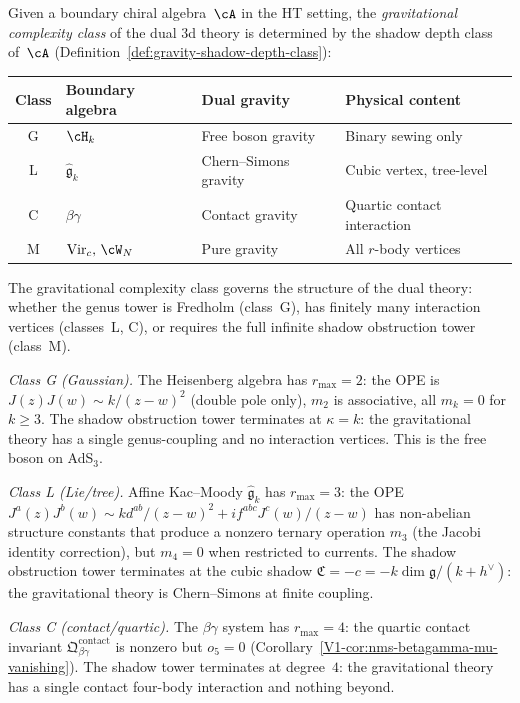 \begin{definition}
\label{def:gravity-complexity-class}
Given a boundary chiral algebra~$\cA$ in the HT setting, the
\emph{gravitational complexity class} of the dual 3d theory is
determined by the shadow depth class of~$\cA$
\textup{(}Definition~\textup{\ref{def:gravity-shadow-depth-class}}\textup{)}:
\begin{center}
\small
\renewcommand{\arraystretch}{1.2}
\begin{tabular}{clll}
\textbf{Class} & \textbf{Boundary algebra}
 & \textbf{Dual gravity} & \textbf{Physical content} \\
\hline
G & $\cH_k$
 & Free boson gravity & Binary sewing only \\[2pt]
L & $\hat{\mathfrak{g}}_k$
 & Chern--Simons gravity & Cubic vertex, tree-level \\[2pt]
C & $\beta\gamma$
 & Contact gravity & Quartic contact interaction \\[2pt]
M & $\mathrm{Vir}_c,\,\cW_N$
 & Pure gravity & All $r$-body vertices
\end{tabular}
\end{center}
The gravitational complexity class governs the structure of the
dual theory: whether the genus tower is Fredholm (class~G), has
finitely many interaction vertices (classes~L, C), or requires
the full infinite shadow obstruction tower (class~M).
\end{definition}

\emph{Class G (Gaussian).}\enspace
The Heisenberg algebra has $r_{\max} = 2$: the OPE is
$J(z)J(w) \sim k/(z-w)^2$ (double pole only), $m_2$ is
associative, all $m_k = 0$ for $k \ge 3$. The shadow obstruction tower
terminates at $\kappa = k$: the gravitational theory has a
single genus-coupling and no interaction vertices. This is
the free boson on AdS$_3$.

\emph{Class L (Lie/tree).}\enspace
Affine Kac--Moody $\hat{\mathfrak{g}}_k$ has $r_{\max} = 3$:
the OPE $J^a(z)J^b(w) \sim kd^{ab}/(z-w)^2
+ if^{abc}J^c(w)/(z-w)$ has non-abelian structure constants
that produce a nonzero ternary operation $m_3$
(the Jacobi identity correction), but $m_4 = 0$ when restricted
to currents. The shadow obstruction tower terminates at the cubic shadow
$\mathfrak{C} = -c = -k\dim\mathfrak{g}/(k+h^\vee)$: the gravitational
theory is Chern--Simons at finite coupling.

\emph{Class C (contact/quartic).}\enspace
The $\beta\gamma$ system has $r_{\max} = 4$: the quartic
contact invariant $\mathfrak{Q}^{\mathrm{contact}}_{\beta\gamma}$
is nonzero but $o_5 = 0$
(Corollary~\ref*{V1-cor:nms-betagamma-mu-vanishing}). The shadow
tower terminates at degree~$4$: the gravitational theory has a
single contact four-body interaction and nothing beyond.

